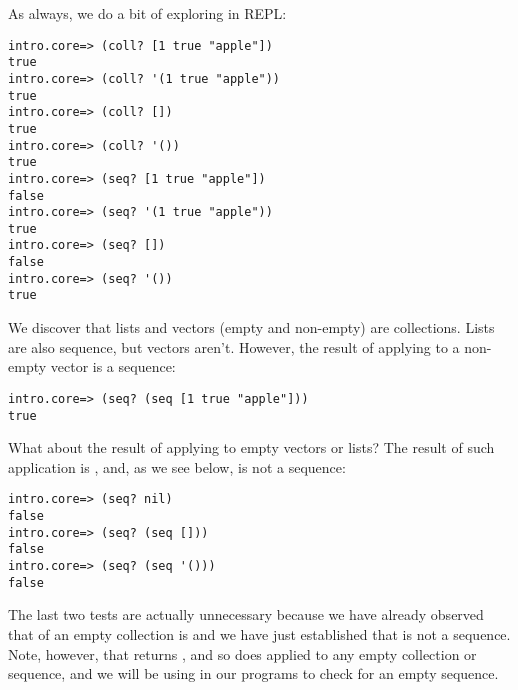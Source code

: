 As always, we do a bit of exploring in REPL:
\begin{framed}
\begin{verbatim}
intro.core=> (coll? [1 true "apple"])
true
intro.core=> (coll? '(1 true "apple"))
true
intro.core=> (coll? [])
true
intro.core=> (coll? '())
true
intro.core=> (seq? [1 true "apple"])
false
intro.core=> (seq? '(1 true "apple"))
true
intro.core=> (seq? [])
false
intro.core=> (seq? '())
true
\end{verbatim}
\end{framed} 
We discover that lists and vectors (empty and non-empty) are collections. Lists are also sequence, but vectors aren't. However, the result of applying  to a non-empty vector is a sequence:
\begin{framed}
\begin{verbatim}
intro.core=> (seq? (seq [1 true "apple"]))
true
\end{verbatim}
\end{framed} 
What about the result of applying  to empty vectors or lists? The result of such application is , and, as we see below,  is not a sequence:
\begin{framed}
\begin{verbatim}
intro.core=> (seq? nil)
false
intro.core=> (seq? (seq []))
false
intro.core=> (seq? (seq '()))
false
\end{verbatim}
\end{framed} 
The last two tests are actually unnecessary because we have already observed that  of an empty collection is  and we have just established that  is not a sequence. Note, however, that  returns , and so does  applied to any empty collection or sequence, and we will be using  in our programs to check for an empty sequence.

